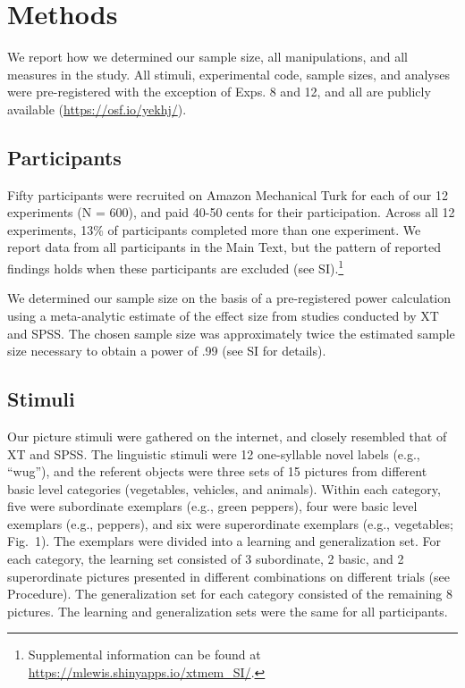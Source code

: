 \documentclass[english,floatsintext,man]{apa6}
\theoremstyle{definition}
\theoremstyle{definition}
\theoremstyle{remark}
\begin{document}
\section{Methods}\label{methods}

We report how we determined our sample size, all manipulations, and all
measures in the study. All stimuli, experimental code, sample sizes, and
analyses were pre-registered with the exception of Exps. 8 and 12, and
all are publicly available (\url{https://osf.io/yekhj/}).

\subsection{Participants}\label{participants}

Fifty participants were recruited on Amazon Mechanical Turk for each of
our 12 experiments (N = 600), and paid 40-50 cents for their
participation. Across all 12 experiments, 13\% of participants completed
more than one experiment. We report data from all participants in the
Main Text, but the pattern of reported findings holds when these
participants are excluded (see
SI).\footnote{Supplemental information can be found at \url{https://mlewis.shinyapps.io/xtmem_SI/}.}

We determined our sample size on the basis of a pre-registered power
calculation using a meta-analytic estimate of the effect size from
studies conducted by XT and SPSS. The chosen sample size was
approximately twice the estimated sample size necessary to obtain a
power of .99 (see SI for details).

\subsection{Stimuli}\label{stimuli}

Our picture stimuli were gathered on the internet, and closely resembled
that of XT and SPSS. The linguistic stimuli were 12 one-syllable novel
labels (e.g., \enquote{wug}), and the referent objects were three sets
of 15 pictures from different basic level categories (vegetables,
vehicles, and animals). Within each category, five were subordinate
exemplars (e.g., green peppers), four were basic level exemplars (e.g.,
peppers), and six were superordinate exemplars (e.g., vegetables;
Fig.~1). The exemplars were divided into a learning and generalization
set. For each category, the learning set consisted of 3 subordinate, 2
basic, and 2 superordinate pictures presented in different combinations
on different trials (see Procedure). The generalization set for each
category consisted of the remaining 8 pictures. The learning and
generalization sets were the same for all participants.
\end{document}
